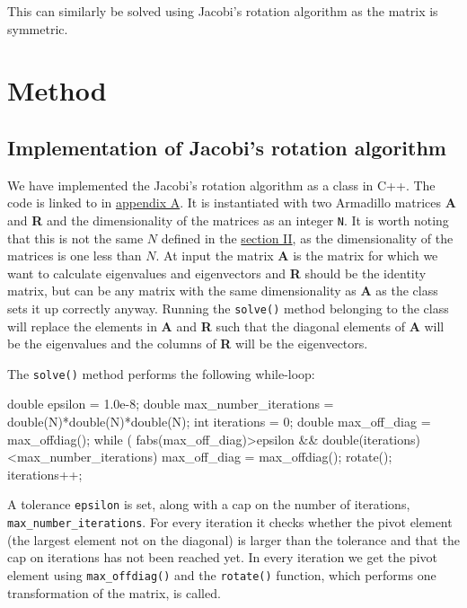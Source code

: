 \documentclass[reprint,english,notitlepage]{revtex4-1}  %
\begin{document}
This can similarly be solved using Jacobi's rotation algorithm as the matrix is symmetric.

\newpage


\section{Method} \label{sec:III}

\subsection{Implementation of Jacobi's rotation algorithm} \label{sec:III:a}

We have implemented the Jacobi's rotation algorithm as a class in C++. The code is linked to in \hyperref[A]{appendix A}. It is instantiated with two Armadillo \citep{Armadillo} matrices \textbf{A} and \textbf{R} and the dimensionality of the matrices as an integer \verb+N+. It is worth noting that this is not the same $N$ defined in the \hyperref[sec:II]{section II}, as the dimensionality of the matrices is one less than $N$. At input the matrix \textbf{A} is the matrix for which we want to calculate eigenvalues and eigenvectors and \textbf{R} should be the identity matrix, but can be any matrix with the same dimensionality as \textbf{A} as the class sets it up correctly anyway. Running the \verb+solve()+ method belonging to the class will replace the elements in \textbf{A} and \textbf{R} such that the diagonal elements of \textbf{A} will be the eigenvalues and the columns of \textbf{R} will be the eigenvectors.

The \verb+solve()+ method performs the following while-loop:

\begin{cpp}
double epsilon = 1.0e-8;
double max_number_iterations = double(N)*double(N)*double(N);
int iterations = 0;
double max_off_diag = max_offdiag();
while ( fabs(max_off_diag)>epsilon &&
        double(iterations)<max_number_iterations){
    max_off_diag = max_offdiag();
    rotate();
    iterations++;
}
\end{cpp}

A tolerance \verb+epsilon+ is set, along with a cap on the number of iterations, \verb+max_number_iterations+. For every iteration it checks whether the pivot element (the largest element not on the diagonal) is larger than the tolerance and that the cap on iterations has not been reached yet. In every iteration we get the pivot element using \verb+max_offdiag()+ and the \verb+rotate()+ function, which performs one transformation of the matrix, is called.
\end{document}
